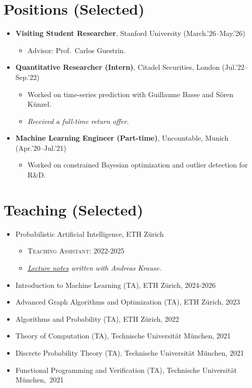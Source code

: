 \documentclass[a4paper,11pt]{article}
\begin{document}
\section*{Positions (Selected)}
\begin{itemize}[leftmargin=1.5em]
  \item \textbf{Visiting Student Researcher}, Stanford University (March.'26--May.'26) \begin{itemize}
    \item Advisor: Prof.\ Carlos Guestrin.
  \end{itemize}
  \item \textbf{Quantitative Researcher (Intern)}, Citadel Securities, London (Jul.'22--Sep.'22) \begin{itemize}
    \item Worked on time-series prediction with Guillaume Basse and Sören Künzel.
    \item \emph{Received a full-time return offer.}
  \end{itemize}
  \item \textbf{Machine Learning Engineer (Part-time)}, Uncountable, Munich (Apr.'20--Jul.'21) \begin{itemize}
    \item Worked on constrained Bayesian optimization and outlier detection for R\&D.
  \end{itemize}
\end{itemize}

\section*{Teaching (Selected)}
\begin{itemize}[leftmargin=1.5em]
  \item {Probabilistic Artificial Intelligence}, ETH Zürich \begin{itemize}
    \item \textsc{Teaching Assistant:} 2022-2025
    \item \emph{\href{https://arxiv.org/pdf/2502.05244}{Lecture notes} written with Andreas Krause.}
  \end{itemize}
  \item {Introduction to Machine Learning (TA)}, ETH Zürich, 2024-2026
  \item {Advanced Graph Algorithms and Optimization (TA)}, ETH Zürich, 2023
  \item {Algorithms and Probability (TA)}, ETH Zürich, 2022
  \item {Theory of Computation (TA)}, Technische Universität München, 2021
  \item {Discrete Probability Theory (TA)}, Technische Universität München, 2021
  \item {Functional Programming and Verification (TA)}, Technische Universität München,~2021
\end{itemize}
\end{document}
